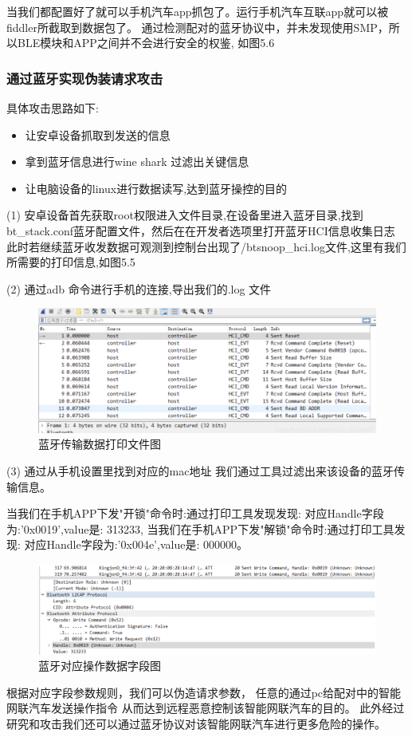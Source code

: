 当我们都配置好了就可以手机汽车app抓包了。运行手机汽车互联app就可以被fiddler所截取到数据包了。
通过检测配对的蓝牙协议中，并未发现使用SMP，所以BLE模块和APP之间并不会进行安全的权鉴, 如图5.6
\newline
\subsubsection{通过蓝牙实现伪装请求攻击}
具体攻击思路如下\cite{von2021method}:
\begin{itemize}
    \item 让安卓设备抓取到发送的信息
    \item 拿到蓝牙信息进行wine shark 过滤出关键信息
    \item 让电脑设备的linux进行数据读写,达到蓝牙操控的目的
\end{itemize}

(1) 安卓设备首先获取root权限进入文件目录,在设备里进入蓝牙目录,找到bt\_stack.conf蓝牙配置文件，然后在在开发者选项里打开蓝牙HCI信息收集日志
此时若继续蓝牙收发数据可观测到控制台出现了/btsnoop\_hci.log文件,这里有我们所需要的打印信息,如图5.5

(2) 通过adb 命令进行手机的连接,导出我们的.log 文件
\begin{figure}
    \centering
    \includegraphics[scale=0.5]{resources/img/i17.png}
    \caption{蓝牙传输数据打印文件图}
  \end{figure}
(3) 通过从手机设置里找到对应的mac地址 我们通过工具过滤出来该设备的蓝牙传输信息。
  
当我们在手机APP下发"开锁"命令时:通过打印工具发现发现:
对应Handle字段为:'0x0019',value是: 313233,
当我们在手机APP下发"解锁"命令时:通过打印工具发现:
对应Handle字段为:'0x004e',value是: 000000。
\begin{figure}
    \centering
    \includegraphics[scale=0.5]{resources/img/i18.png}
    \caption{蓝牙对应操作数据字段图}
  \end{figure}
根据对应字段参数规则，我们可以伪造请求参数\cite{lu2005conditional}，
任意的通过pc给配对中的智能网联汽车发送操作指令
从而达到远程恶意控制该智能网联汽车的目的。
此外经过研究和攻击我们还可以通过蓝牙协议对该智能网联汽车进行更多危险的操作。

